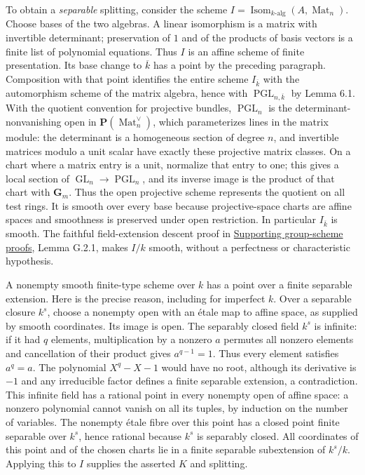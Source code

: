 \documentclass[11pt,a4paper,openany]{report}
\newcounter{none}
\begin{document}
To obtain a \emph{separable} splitting, consider the scheme \(I=\operatorname{Isom}_{k\text{-alg}}(A,\operatorname{Mat}_n)\). Choose bases of the two algebras. A linear isomorphism is a matrix with invertible determinant; preservation of \(1\) and of the products of basis vectors is a finite list of polynomial equations. Thus \(I\) is an affine scheme of finite presentation. Its base change to \(\overline k\) has a point by the preceding paragraph. Composition with that point identifies the entire scheme \(I_{\overline k}\) with the automorphism scheme of the matrix algebra, hence with \(\operatorname{PGL}_{n,\overline k}\) by Lemma 6.1. With the quotient convention for projective bundles, \(\operatorname{PGL}_n\) is the determinant-nonvanishing open in \(\mathbf P(\operatorname{Mat}_n^\vee)\), which parameterizes lines in the matrix module: the determinant is a homogeneous section of degree \(n\), and invertible matrices modulo a unit scalar have exactly these projective matrix classes. On a chart where a matrix entry is a unit, normalize that entry to one; this gives a local section of \(\operatorname{GL}_n\to\operatorname{PGL}_n\), and its inverse image is the product of that chart with \(\mathbf G_m\). Thus the open projective scheme represents the quotient on all test rings. It is smooth over every base because projective-space charts are affine spaces and smoothness is preserved under open restriction. In particular \(I_{\overline k}\) is smooth. The faithful field-extension descent proof in \href{https://github.com/KokunoYumeto/open-math-courses/blob/main/docs/courses/AG-RG/AG-RG-S08.md}{Supporting group-scheme proofs}, Lemma G.2.1, makes \(I/k\) smooth, without a perfectness or characteristic hypothesis.

A nonempty smooth finite-type scheme over \(k\) has a point over a finite separable extension. Here is the precise reason, including for imperfect \(k\). Over a separable closure \(k^s\), choose a nonempty open with an étale map to affine space, as supplied by smooth coordinates. Its image is open. The separably closed field \(k^s\) is infinite: if it had \(q\) elements, multiplication by a nonzero \(a\) permutes all nonzero elements and cancellation of their product gives \(a^{q-1}=1\). Thus every element satisfies \(a^q=a\). The polynomial \(X^q-X-1\) would have no root, although its derivative is \(-1\) and any irreducible factor defines a finite separable extension, a contradiction. This infinite field has a rational point in every nonempty open of affine space: a nonzero polynomial cannot vanish on all its tuples, by induction on the number of variables. The nonempty étale fibre over this point has a closed point finite separable over \(k^s\), hence rational because \(k^s\) is separably closed. All coordinates of this point and of the chosen charts lie in a finite separable subextension of \(k^s/k\). Applying this to \(I\) supplies the asserted \(K\) and splitting.
\end{document}
